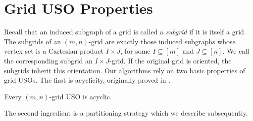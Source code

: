 \documentclass[runningheads,a4paper]{llncs}
\newcommand{\JN}[1]{\marginpar{\parbox{3.6cm}{{\small {\bf JN:} #1}}}} %
\begin{document}


\section{Grid USO Properties}\label{section:grid_uso_properties}




Recall that an induced subgraph of a grid is called a \emph{subgrid} if it is itself a grid.
The subgrids of an $(m,n)$-grid are exactly those induced subgraphs whose vertex set is a
Cartesian product $I \times J$, for some $I \subseteq [m]$ and $J \subseteq [n]$. We call the corresponding subgrid an $I\times J$-grid.
If the original grid is oriented, the subgrids inherit this orientation. 
Our algorithms rely on two basic properties of grid USOs.
The first is acyclicity, originally proved in \cite{grid08}.
\begin{lemma}
\label{lemma:acyclicity_lemma}
Every $(m,n)$-grid USO is acyclic.
\end{lemma}
The second ingredient is a partitioning strategy which we describe subsequently.
\end{document}
